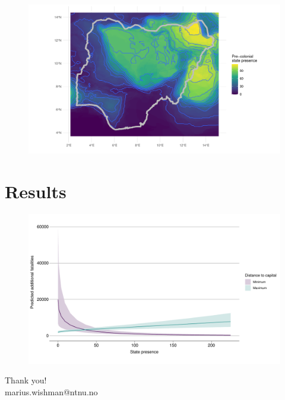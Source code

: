 \documentclass{beamer}
\begin{document}
\begin{frame} %
	\begin{figure}
		\includegraphics[width=\linewidth]{../R/Output/nigeria.pdf}
	\end{figure}
\end{frame}

\section{Results}

\begin{frame}
	\begin{figure}
		\includegraphics[width=\linewidth]{"../R/Output/interdeathszinbplot.pdf"}
	\end{figure}
\end{frame}

\begin{frame}
	\centering
	\Large Thank you!\\
	\bigskip
	\bigskip
	\tiny marius.wishman@ntnu.no
\end{frame}
\end{document}
